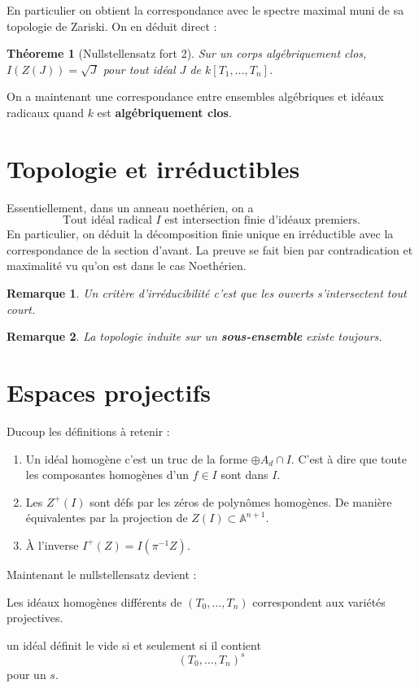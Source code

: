 \documentclass[a4paper,12pt]{book}
\newcommand{\A}{\mathbb{A}}
\theoremstyle{plain}
\newtheorem{thm}[subsection]{Théoreme}
\newtheorem{rem}{Remarque}
\theoremstyle{definition}
\theoremstyle{remark}
\begin{document}
En particulier on obtient la correspondance avec le spectre maximal
muni de sa topologie de Zariski. On en déduit direct :
\begin{thm}[Nullstellensatz fort 2]
    Sur un corps algébriquement clos, $I(Z(J))=\sqrt J$ pour tout idéal
    $J$ de $k[T_1,\ldots, T_n]$.
\end{thm}

On a maintenant une correspondance entre ensembles algébriques et
idéaux radicaux quand $k$ est \textbf{algébriquement clos}.
\section{Topologie et irréductibles}
Essentiellement, dans un anneau noethérien, on a 
\[\textrm{Tout idéal radical } I \textrm{ est intersection finie 
d'idéaux premiers.}\]
En particulier, on déduit la décomposition finie unique en irréductible
avec la correspondance de la section d'avant. La preuve se fait
bien par contradication et maximalité vu qu'on est dans le cas
Noethérien.
\begin{rem}
    Un critère d'irréducibilité c'est que les ouverts s'intersectent
    tout court.
\end{rem}
\begin{rem}
    La topologie induite sur un \textbf{sous-ensemble} existe toujours.
\end{rem}

\section{Espaces projectifs}
Ducoup les définitions à retenir :
\begin{enumerate}
    \item Un idéal homogène c'est un truc de la forme $\oplus A_d\cap I$.
	C'est à dire que toute les composantes homogènes d'un $f\in I$ 
	sont dans $I$.
    \item Les $Z^+(I)$ sont défs par les zéros de polynômes homogènes.
	De manière équivalentes par la projection de
	$Z(I)\subset \A^{n+1}$.
    \item À l'inverse $I^+(Z)=I(\pi^{-1}Z)$. 
\end{enumerate}
Maintenant le nullstellensatz devient :
\begin{center}
    Les idéaux homogènes différents de $(T_0,\ldots,T_n)$ correspondent
    aux variétés projectives.
\end{center}
un idéal définit le vide si et seulement si il contient
\[(T_0,\ldots,T_n)^s\] pour un $s$.
\end{document}
